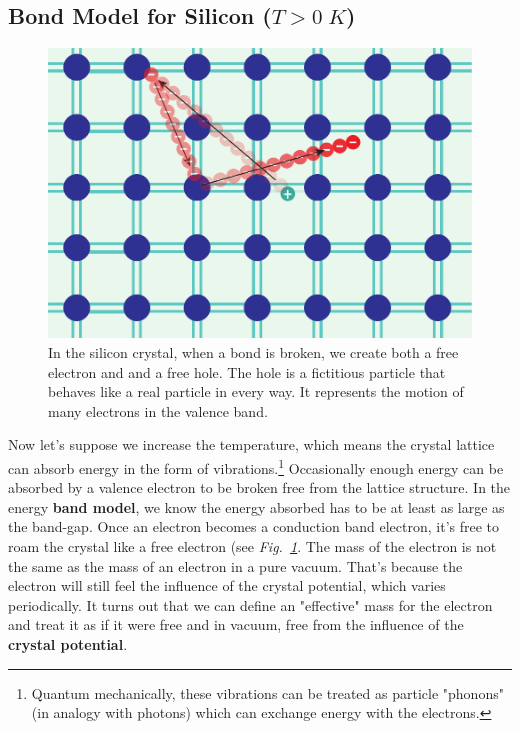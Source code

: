 \subsection{Bond Model for Silicon (\texorpdfstring{$T>0\;K$}{T > 0K})}
\begin{figure}[tb]
\centering
\includegraphics[width=.5\columnwidth]{silicon_broken_bond_motion}
\caption{In the silicon crystal, when a bond is broken, we create both a free electron and and a free hole.  The hole is a fictitious particle that behaves like a real particle in every way. It represents the motion of many electrons in the valence band.}
\label{fig:silicon_broken_bond}
\end{figure}
Now let's suppose we increase the temperature, which means the crystal lattice can absorb energy in the form of vibrations.\footnote{Quantum mechanically, these vibrations can be treated as particle "phonons" (in analogy with photons) which can exchange energy with the electrons.}  Occasionally enough energy can be absorbed by a valence electron to be broken free from the lattice structure.  In the energy \textbf{band model}, we know the energy absorbed has to be at least as large as the band-gap.  Once an electron becomes a conduction band electron, it's free to roam the crystal like a free electron (see \emph{Fig.~\ref{fig:silicon_broken_bond}}.  The mass of the electron is not the same as the mass of an electron in a pure vacuum.  That's because the electron will still feel the influence of the crystal potential, which varies periodically.  It turns out that we can define an "effective" mass for the electron and treat it as if it were free and in vacuum, free from the influence of the \textbf{crystal potential}. 
